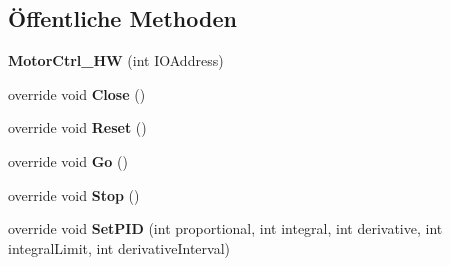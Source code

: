 \subsection*{Öffentliche Methoden}
\begin{DoxyCompactItemize}
\item 
\hypertarget{class_robot_ctrl_1_1_motor_ctrl___h_w_af9fb7c75d12f00d852304d58bd31bcea}{
{\bfseries MotorCtrl\_\-HW} (int IOAddress)}
\label{class_robot_ctrl_1_1_motor_ctrl___h_w_af9fb7c75d12f00d852304d58bd31bcea}

\item 
\hypertarget{class_robot_ctrl_1_1_motor_ctrl___h_w_a134912d08a58d3762ce7694294599d7c}{
override void {\bfseries Close} ()}
\label{class_robot_ctrl_1_1_motor_ctrl___h_w_a134912d08a58d3762ce7694294599d7c}

\item 
\hypertarget{class_robot_ctrl_1_1_motor_ctrl___h_w_a1a116e83d87c50119567ff4ae334b239}{
override void {\bfseries Reset} ()}
\label{class_robot_ctrl_1_1_motor_ctrl___h_w_a1a116e83d87c50119567ff4ae334b239}

\item 
\hypertarget{class_robot_ctrl_1_1_motor_ctrl___h_w_a451b6be6938c652e8a284545a1929089}{
override void {\bfseries Go} ()}
\label{class_robot_ctrl_1_1_motor_ctrl___h_w_a451b6be6938c652e8a284545a1929089}

\item 
\hypertarget{class_robot_ctrl_1_1_motor_ctrl___h_w_ad7a992614ff75966b4381f8f8ef56cfd}{
override void {\bfseries Stop} ()}
\label{class_robot_ctrl_1_1_motor_ctrl___h_w_ad7a992614ff75966b4381f8f8ef56cfd}

\item 
\hypertarget{class_robot_ctrl_1_1_motor_ctrl___h_w_a24f22cd266cce1e701f9823e02816ff5}{
override void {\bfseries SetPID} (int proportional, int integral, int derivative, int integralLimit, int derivativeInterval)}
\label{class_robot_ctrl_1_1_motor_ctrl___h_w_a24f22cd266cce1e701f9823e02816ff5}

\end{DoxyCompactItemize}
